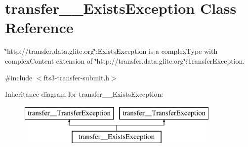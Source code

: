 \section{transfer\_\-\_\-ExistsException Class Reference}
\label{classtransfer____ExistsException}


\char`\"{}http://transfer.data.glite.org\char`\"{}:ExistsException is a complexType with complexContent extension of \char`\"{}http://transfer.data.glite.org\char`\"{}:TransferException.  




{\ttfamily \#include $<$fts3-\/transfer-\/submit.h$>$}

Inheritance diagram for transfer\_\-\_\-ExistsException:\begin{figure}[H]
\begin{center}
\leavevmode
\includegraphics[height=2.000000cm]{classtransfer____ExistsException}
\end{center}
\end{figure}
